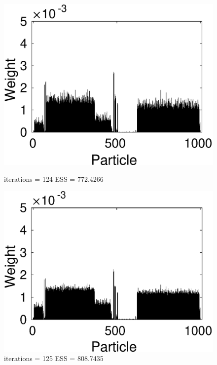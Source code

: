 \documentclass[12pt]{article}
\begin{document}
\begin{figure}[h!]
\begin{minipage}{0.5\textwidth}
		\includegraphics[scale = 0.5]{./Figures/124.eps}
		\caption*{iterations = 124 ESS = 772.4266}
	\end{minipage}%
	\begin{minipage}{0.5\textwidth}
		\centering
		\includegraphics[scale = 0.5]{./Figures/125.eps}
		\caption*{iterations = 125 ESS = 808.7435}
	\end{minipage}
\end{figure}
\end{document}
